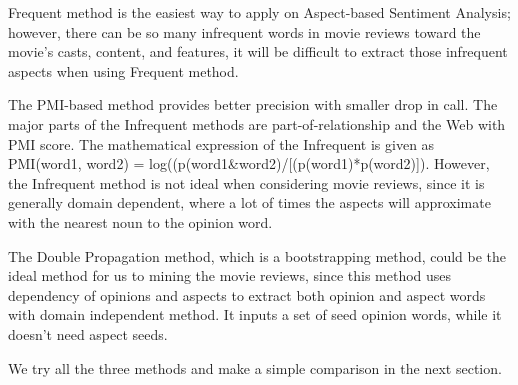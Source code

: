 \documentclass[12pt]{article}
\begin{document}
	Frequent method is the easiest way to apply on Aspect-based Sentiment Analysis; however, there can be so many infrequent words in movie reviews toward the movie’s casts, content, and features, it will be difficult to extract those infrequent aspects when using Frequent method. 

The PMI-based method provides better precision with smaller drop in call. The major parts of the Infrequent methods are part-of-relationship and the Web with PMI score. The mathematical expression of the Infrequent is given as PMI(word1, word2) = log((p(word1&word2)/[(p(word1)*p(word2)]). However, the Infrequent method is not ideal when considering movie reviews, since it is generally domain dependent,  where a lot of times the aspects will approximate with the nearest noun to the opinion word.

The Double Propagation method, which is a bootstrapping method,  could be the ideal method for us to mining the movie reviews, since this method uses dependency of opinions and  aspects to extract both opinion and aspect words with domain independent method.  It inputs a set of seed opinion words, while it doesn't need aspect seeds.

We try all the three methods and make a simple comparison in the next section.


\end{document}
